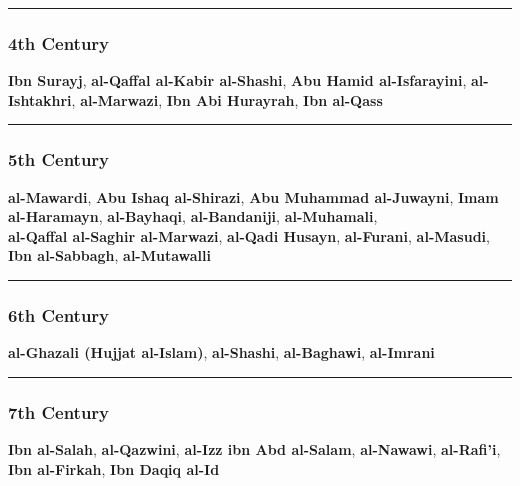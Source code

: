 \documentclass[
  a4paper,
  DIV=11,
  numbers=noendperiod]{scrartcl}
\begin{document}
\begin{center}\rule{0.5\linewidth}{0.5pt}\end{center}

\subsubsection{4th Century}\label{th-century}

\textbf{Ibn Surayj}, \textbf{al-Qaffal al-Kabir al-Shashi}, \textbf{Abu
Hamid al-Isfarayini}, \textbf{al-Ishtakhri}, \textbf{al-Marwazi},
\textbf{Ibn Abi Hurayrah}, \textbf{Ibn al-Qass}

\begin{center}\rule{0.5\linewidth}{0.5pt}\end{center}

\subsubsection{5th Century}\label{th-century-1}

\textbf{al-Mawardi}, \textbf{Abu Ishaq al-Shirazi}, \textbf{Abu Muhammad
al-Juwayni}, \textbf{Imam al-Haramayn}, \textbf{al-Bayhaqi},
\textbf{al-Bandaniji}, \textbf{al-Muhamali},\\
\textbf{al-Qaffal al-Saghir al-Marwazi}, \textbf{al-Qadi Husayn},
\textbf{al-Furani}, \textbf{al-Masudi}, \textbf{Ibn al-Sabbagh},
\textbf{al-Mutawalli}

\begin{center}\rule{0.5\linewidth}{0.5pt}\end{center}

\subsubsection{6th Century}\label{th-century-2}

\textbf{al-Ghazali (Hujjat al-Islam)}, \textbf{al-Shashi},
\textbf{al-Baghawi}, \textbf{al-Imrani}

\begin{center}\rule{0.5\linewidth}{0.5pt}\end{center}

\subsubsection{7th Century}\label{th-century-3}

\textbf{Ibn al-Salah}, \textbf{al-Qazwini}, \textbf{al-Izz ibn Abd
al-Salam}, \textbf{al-Nawawi}, \textbf{al-Rafi'i}, \textbf{Ibn
al-Firkah}, \textbf{Ibn Daqiq al-Id}
\end{document}
